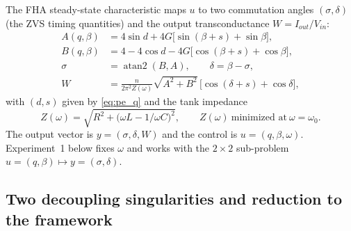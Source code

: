 \documentclass[11pt,american]{article}
\theoremstyle{definition}
\theoremstyle{plain}
\theoremstyle{remark}
\begin{document}
The FHA steady-state characteristic maps $u$ to two commutation angles $(\sigma,\delta)$ (the ZVS timing quantities) and the output transconductance $W = I_{out}/V_{in}$:
\begin{align}
A(q,\beta) &= 4\sin d + 4G\bigl[\sin(\beta+s) + \sin\beta\bigr], \label{eq:pe_A}\\
B(q,\beta) &= 4 - 4\cos d - 4G\bigl[\cos(\beta+s) + \cos\beta\bigr], \label{eq:pe_B}\\
\sigma &= \operatorname{atan2}(B, A), \qquad \delta = \beta - \sigma, \label{eq:pe_sigdel}\\
W &= \frac{n}{2\pi^2 Z(\omega)}\sqrt{A^2+B^2}\,\bigl[\cos(\delta+s) + \cos\delta\bigr], \label{eq:pe_W}
\end{align}
with $(d,s)$ given by \eqref{eq:pe_q} and the tank impedance
\begin{equation}\label{eq:pe_Z}
Z(\omega) = \sqrt{R^2 + \bigl(\omega L - 1/\omega C\bigr)^2}, \qquad Z(\omega)\ \text{minimized at}\ \omega = \omega_0 .
\end{equation}
The output vector is $y = (\sigma, \delta, W)$ and the control is $u = (q,\beta,\omega)$. Experiment~1 below fixes $\omega$ and works with the $2\times 2$ sub-problem $u=(q,\beta)\mapsto y=(\sigma,\delta)$.

\subsection{Two decoupling singularities and reduction to the framework}
\end{document}
